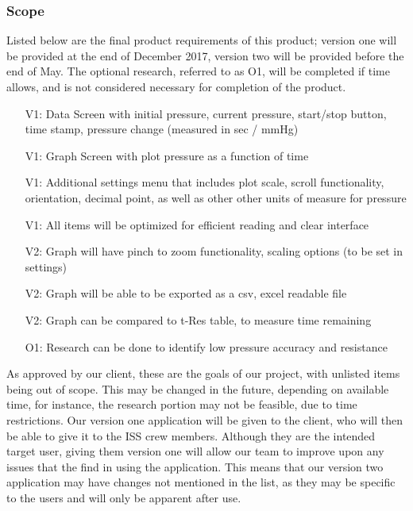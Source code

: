 \documentclass[onecolumn, draftclsnofoot,10pt, compsoc]{IEEEtran}
\begin{document}
\subsubsection{Scope}
Listed below are the final product requirements of this product; version one will be provided at the end of December 2017, version two will be provided before the end of May.
The optional research, referred to as O1, will be completed if time allows, and is not considered necessary for completion of the product.

\begin{itemize}
\item[V1:] Data Screen with initial pressure, current pressure, start/stop button, time stamp, pressure change (measured in sec / mmHg)
\item[V1:] Graph Screen with plot pressure as a function of time
\item[V1:] Additional settings menu that includes plot scale, scroll functionality, orientation, decimal point, as well as other other units of measure for pressure
\item[V1:] All items will be optimized for efficient reading and clear interface
\item[V2:] Graph will have pinch to zoom functionality, scaling options (to be set in settings)
\item[V2:] Graph will be able to be exported as a csv, excel readable file
\item[V2:] Graph can be compared to t-Res table, to measure time remaining
\item[O1:] Research can be done to identify low pressure accuracy and resistance
\end{itemize}

As approved by our client, these are the goals of our project, with unlisted items being out of scope.
This may be changed in the future, depending on available time, for instance, the research portion may not be feasible, due to time restrictions.
Our version one application will be given to the client, who will then be able to give it to the ISS crew members.
Although they are the intended target user, giving them version one will allow our team to improve upon any issues that the find in using the application.
This means that our version two application may have changes not mentioned in the list, as they may be specific to the users and will only be apparent after use.
\end{document}
